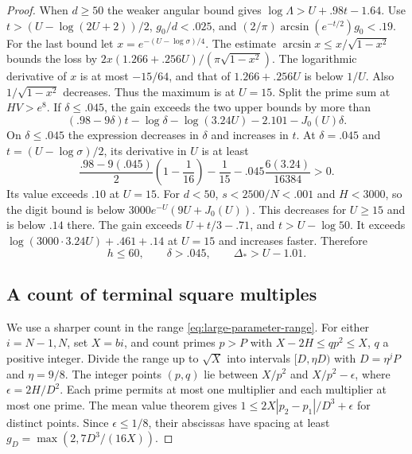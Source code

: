 \begin{proof}
When \(d\ge50\) the weaker angular bound gives
\(\log\Lambda>U+.98t-1.64\).
Use \(t>(U-\log(2U+2))/2\), \(g_0/d<.025\), and
\((2/\pi)\arcsin(e^{-t/2})g_0<.19\).
For the last bound let \(x=e^{-(U-\log\sigma)/4}\).
The estimate \(\arcsin x\le x/\sqrt{1-x^2}\) bounds the loss
by \(2x(1.266+.256U)/(\pi\sqrt{1-x^2})\).
The logarithmic derivative of \(x\) is at most \(-15/64\),
and that of \(1.266+.256U\) is below \(1/U\).
Also \(1/\sqrt{1-x^2}\) decreases. Thus the maximum is at \(U=15\). Split the prime sum at \(HV>e^8\).
If \(\delta\le .045\), the gain exceeds the two upper bounds
by more than
\[
 (.98-9\delta)t-\log\delta-\log(3.24U)-2.101-J_0(U)\delta.
\]
On \(\delta\le.045\) the expression decreases in \(\delta\)
and increases in \(t\). At \(\delta=.045\) and
\(t=(U-\log\sigma)/2\), its derivative in \(U\) is at least
\[
 \frac{.98-9(.045)}2\left(1-\frac1{16}\right)
           -\frac1{15}-.045\frac{6(3.24)}{16384}>0 .
\]
Its value exceeds \(.10\) at \(U=15\).
For \(d<50\), \(s<2500/N<.001\) and \(H<3000\), so the
digit bound is below
\(3000e^{-U}(9U+J_0(U))\). This decreases for \(U\ge15\)
and is below \(.14\) there. The gain exceeds \(U+t/3-.71\), and \(t>U-\log50\).
It exceeds \(\log(3000\cdot3.24U)+.461+.14\) at \(U=15\) and
increases faster. Therefore
\begin{equation}\label{eq:large-degree}
 h\le60,\qquad \delta>.045,\qquad \Delta_*>U-1.01 .
\end{equation}

\subsection*{A count of terminal square multiples}

We use a sharper count in the range \eqref{eq:large-parameter-range}.
For either \(i=N-1,N\), set \(X=bi\), and count primes \(p>P\)
with \(X-2H\le qp^2\le X\), \(q\) a positive integer.
Divide the range up to \(\sqrt X\) into intervals
\([D,\eta D)\) with \(D=\eta^j P\) and \(\eta=9/8\).
The integer points \((p,q)\) lie between \(X/p^2\) and
\(X/p^2-\epsilon\), where \(\epsilon=2H/D^2\).
Each prime permits at most one multiplier and each multiplier
at most one prime. The mean value theorem gives
\(1\le2X|p_2-p_1|/D^3+\epsilon\) for distinct points.
Since \(\epsilon\le1/8\), their abscissas have spacing at least
\(g_D=\max(2,7D^3/(16X))\).


\end{proof}
